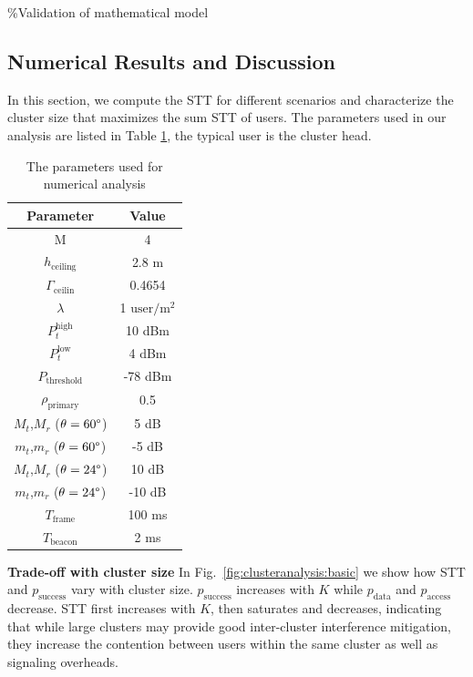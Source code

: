 \documentclass[10pt, conference, letterpaper]{IEEEtran}
\begin{document}
\%Validation of mathematical model

\subsection{Numerical Results and Discussion}
In this section, we compute the STT for different scenarios and characterize the cluster size that maximizes the sum STT of users. 
The parameters used in our analysis are listed in Table \ref{tab:clusteranalysis:parameter}, the typical user is the cluster head. 

\begin{table}
	\centering
	\caption{The parameters used for numerical analysis}
	\begin{tabular}{cc}
		\hline
		Parameter & Value \\
		\hline
		M & 4 \\
		$h_{\mathrm{ceiling}}$ & 2.8 m \\
		$\Gamma_{\mathrm{ceilin}}$ & 0.4654 \\
		$\lambda$ & 1 $\mathrm{user/m^2}$ \\
		$P_t^{\mathrm{high}}$ & 10 dBm \\
		$P_t^{\mathrm{low}}$ & 4 dBm \\
		$P_{\mathrm{threshold}}$ & -78 dBm \\
		$\rho_{\mathrm{primary}}$ & 0.5 \\
		$M_t$,$M_r$ ($\theta = 60\degree$) & 5 dB \\
		$m_t$,$m_r$ ($\theta = 60\degree$) & -5 dB \\
		$M_t$,$M_r$ ($\theta = 24\degree$) & 10 dB \\
		$m_t$,$m_r$ ($\theta = 24\degree$) & -10 dB \\		
		$T_{\mathrm{frame}}$ & 100 ms \\
		$T_{\mathrm{beacon}}$ & 2 ms \\
		\hline
	\end{tabular}
	\label{tab:clusteranalysis:parameter}	
\end{table}

\textbf{Trade-off with cluster size} In Fig.~\ref{fig:clusteranalysis:basic} we show how STT and $p_{\mathrm{success}}$ vary with cluster size.  
$p_{\mathrm{success}}$ increases with $K$ while $p_{\mathrm{data}}$ and $p_{\mathrm{access}}$ decrease. 
STT first increases with $K$, then saturates and decreases, indicating that while large clusters may provide good inter-cluster interference mitigation, they increase the contention between users within the same cluster as well as signaling overheads. 
\end{document}

